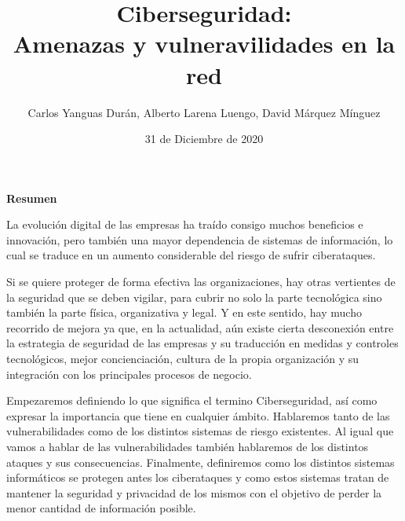  
  
  

\graphicspath{{../Book/figures/}{../Book/diagrams/}{../Book/photos/}} 

 
\title{{\Huge Ciberseguridad: \\ Amenazas y vulneravilidades en la red}}
\date{{\large 31 de Diciembre de 2020}}
\author{{\Large  Carlos Yanguas Durán, Alberto Larena Luengo, David Márquez Mínguez}}



\maketitle
\thispagestyle{empty}\null\newpage




\setcounter{page}{1}
\begin{center}
 {\bfseries \Large Resumen}
\end{center}

La evolución digital de las empresas ha traído consigo muchos beneficios e innovación, pero también una mayor dependencia de sistemas de información, lo cual se traduce en un aumento considerable del riesgo de sufrir ciberataques.

Si se quiere proteger de forma efectiva las organizaciones, hay otras vertientes de la seguridad que se deben vigilar, para cubrir no solo la parte tecnológica sino también la parte física, organizativa y legal. Y en este sentido, hay mucho recorrido de mejora ya que, en la actualidad, aún existe cierta desconexión entre la estrategia de seguridad de las empresas y su traducción en medidas y controles tecnológicos, mejor concienciación, cultura de la propia organización y su integración con los principales procesos de negocio.

Empezaremos definiendo lo que significa el termino Ciberseguridad, así como expresar la importancia que tiene en cualquier ámbito. Hablaremos tanto de las vulnerabilidades como de los distintos sistemas de riesgo existentes. Al igual que vamos a hablar de las vulnerabilidades también hablaremos de los distintos ataques y sus consecuencias. Finalmente, definiremos como los distintos sistemas informáticos se protegen antes los ciberataques y como estos sistemas tratan de mantener la seguridad y privacidad de los mismos con el objetivo de perder la menor cantidad de información posible.


